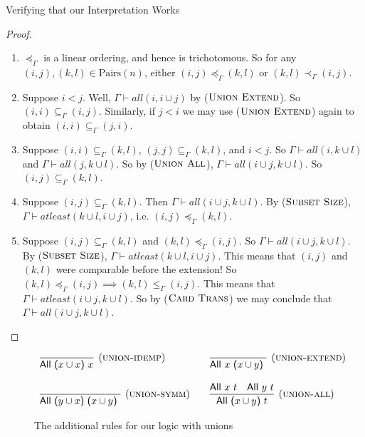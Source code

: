 \documentclass[12pt]{article}
\theoremstyle{definition}
\newlength{\mathfrwidth}
\newenvironment{mathframe}
    {\begin{lrbox}{\mathfrbox}\begin{minipage}{\mathfrwidth}\begin{center}}
    {\end{center}\end{minipage}\end{lrbox}\noindent\fbox{\usebox{\mathfrbox}}}
\newcommand{\Pairs}{\mbox{Pairs}}
\newcommand{\provsub}{\subseteq_{\Gamma}}
\newcommand{\provle}{\le_{\Gamma}}
\newcommand{\provextended}{\preceq_{\Gamma}}
\newcommand{\provextendedstrict}{\prec_{\Gamma}}
\newcommand{\proverule}{\textsc}
\begin{document}
\begin{section}{Verifying that our Interpretation Works}
\begin{proof}
\begin{enumerate}
    
    \item $\provextended$ is a linear ordering, and hence is trichotomous.  So for any $(i, j), (k, l) \in \Pairs(n)$, either $(i,j) \provextended (k,l)$ or $(k,l) \provextendedstrict (i,j)$.
    
    \item Suppose $i < j$.  Well, $\Gamma \vdash all(i, i \cup j)$ by ($\proverule{Union Extend}$).  So $(i, i) \provsub (i, j)$.  Similarly, if $j < i$ we may use ($\proverule{Union Extend}$) again to obtain $(i, i) \provsub (j, i)$.
    
    \item Suppose $(i, i) \provsub (k, l)$, $(j, j) \provsub (k, l)$, and $i < j$.  So $\Gamma \vdash all(i, k \cup l)$ and $\Gamma \vdash all(j, k \cup l)$.  So by ($\proverule{Union All}$), $\Gamma \vdash all(i \cup j, k \cup l)$.  So $(i, j) \provsub (k, l)$.
    
    \item Suppose $(i, j) \provsub (k, l)$.  Then $\Gamma \vdash all(i \cup j, k \cup l)$.  By ($\proverule{Subset Size}$), $\Gamma \vdash atleast(k \cup l, i \cup j)$, i.e. $(i, j) \provextended (k, l)$.
    
    \item Suppose $(i, j) \provsub (k, l)$ and $(k, l) \provextended (i, j)$.  So $\Gamma \vdash all(i \cup j, k \cup l)$.  By ($\proverule{Subset Size}$), $\Gamma \vdash atleast(k \cup l, i \cup j)$.  This means that $(i,j)$ and $(k,l)$ were comparable before the extension!  So $(k,l) \provextended (i,j) \implies (k,l) \provle (i,j)$.  This means that $\Gamma \vdash atleast(i \cup j, k \cup l)$.  So by ($\proverule{Card Trans}$) we may conclude that $\Gamma \vdash all(i \cup j, k \cup l)$.
    
\end{enumerate}



\end{proof}

\end{section}

\begin{figure}[t]
\begin{mathframe}
\[
\begin{array}{l@{\qquad}l@{\qquad}l}
\infer[(\proverule{union-idemp})]{\mbox{\sf All ($x\cup x$) $x$}}{} &
\infer[(\proverule{union-extend})]{\mbox{\sf All $x$ ($x\cup y$) }}{}   \\  \\
\infer[(\proverule{union-symm})]{\mbox{\sf All ($y \cup x$) ($x\cup y$) }}{} &
\infer[(\proverule{union-all})]{\mbox{\sf All ($x\cup y$) $t$}}{\mbox{\sf All $x$ $t$} & \mbox{\sf All $y$ $t$}}
\end{array}
\]
\caption{The additional rules for our logic with unions
\label{fig-all-unions}}
\end{mathframe}
\end{figure}
\end{document}
